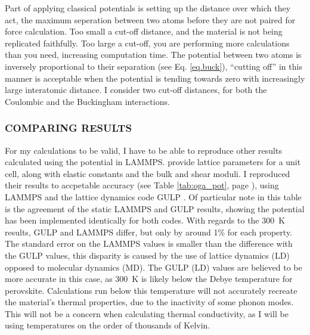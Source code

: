 Part of applying classical potentials is setting up the distance over which they act, the maximum seperation between two atoms before they are not paired for force calculation. Too small a cut-off distance, and the material is not being replicated faithfully. Too large a cut-off, you are performing more calculations than you need, increasing computation time. The potential between two atoms is inversely proportional to their separation (see Eq. \ref{eq.buck}), ``cutting off'' in this manner is acceptable when the potential is tending towards zero with increasingly large interatomic distance. I consider two cut-off distances, for both the Coulombic and the Buckingham interactions.


\subsubsection{COMPARING RESULTS}

For my calculations to be valid, I have to be able to reproduce other results calculated using the \citet{Oganov2000} potential in LAMMPS. \citeauthor{Oganov2000} provide lattice parameters for a unit cell, along with elastic constants and the bulk and shear moduli. I reproduced their results to accpetable accuracy (see Table \ref{tab:oga_pot}, page \pageref{tab:oga_pot}), using LAMMPS and the lattice dynamics code GULP \citep{Gale1997}. Of particular note in this table is the agreement of the static LAMMPS and GULP results, showing the potential has been implemented identically for both codes. With regards to the 300~K results, GULP and LAMMPS differ, but only by around 1\% for each property. The standard error on the LAMMPS values is smaller than the difference with the GULP values, this disparity is caused by the use of lattice dynamics (LD) opposed to molecular dynamics (MD). The GULP (LD) values are believed to be more accurate in this case, 
as 300~K is likely below the Debye temperature for perovskite. Calculations run below this temperature will not accurately recreate the material's thermal properties, due to the inactivity of some phonon modes. This will not be a concern when calculating thermal conductivity, as I will be using temperatures on the order of thousands of Kelvin.

